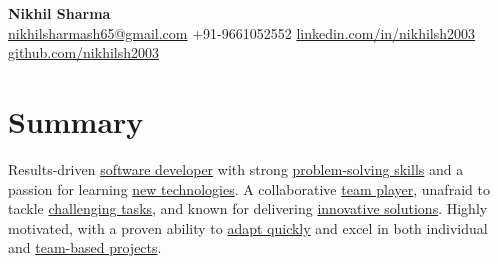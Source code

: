 \documentclass[a4paper,10pt]{article} %
\begin{document}
\begin{center}
    {\Huge \textbf{Nikhil Sharma}} \\
    \vspace{6pt} %
    \small
    \faEnvelope \href{mailto:nikhilsharmash65@gmail.com}{nikhilsharmash65@gmail.com} \hspace{1.5em} %
    \faMobile \hspace{0.3em} +91-9661052552 \hspace{1.5em} %
    \faLinkedinSquare \href{https://www.linkedin.com/in/nikhilsh2003/}{linkedin.com/in/nikhilsh2003} \hspace{1.5em} %
    \faGithub \href{https://github.com/nikhilsh2003}{github.com/nikhilsh2003} %
\end{center}

\vspace{0.3em} %

\section*{Summary}
Results-driven \underline{software developer} with strong \underline{problem-solving skills} and a passion for learning \underline{new technologies}. A collaborative \underline{team player}, unafraid to tackle \underline{challenging tasks}, and known for delivering \underline{innovative solutions}. Highly motivated, with a proven ability to \underline{adapt quickly} and excel in both individual and \underline{team-based projects}.
\vspace{0.3em} %

\end{document}
